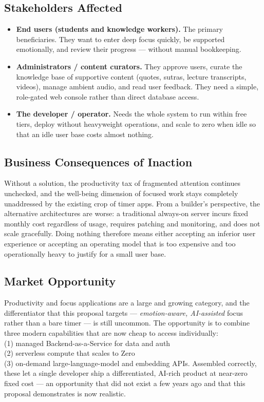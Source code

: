 \documentclass[a4paper,11pt]{article}
\begin{document}
	\subsection{Stakeholders Affected}
	\begin{itemize}
		\item \textbf{End users (students and knowledge workers).} The primary beneficiaries.
		      They want to enter deep focus quickly, be supported emotionally, and review their
		      progress --- without manual bookkeeping.
		\item \textbf{Administrators / content curators.} They approve users, curate the
		      knowledge base of supportive content (quotes, sutras, lecture transcripts,
		      videos), manage ambient audio, and read user feedback. They need a simple,
		      role-gated web console rather than direct database access.
		\item \textbf{The developer / operator.} Needs the whole system to run within free
		      tiers, deploy without heavyweight operations, and scale to zero when idle so that
		      an idle user base costs almost nothing.
	\end{itemize}

	\subsection{Business Consequences of Inaction}
	Without a solution, the productivity tax of fragmented attention continues unchecked, and
	the well-being dimension of focused work stays completely unaddressed by the existing crop
	of timer apps. From a builder's perspective, the alternative architectures are worse:
	a traditional always-on server incurs fixed monthly cost regardless of usage, requires
	patching and monitoring, and does not scale gracefully. Doing nothing therefore means
	either accepting an inferior user experience or accepting an operating model that is too
	expensive and too operationally heavy to justify for a small user base.

	\subsection{Market Opportunity}
	Productivity and focus applications are a large and growing category, and the differentiator
	that this proposal targets --- \emph{emotion-aware, AI-assisted} focus rather than a bare
	timer --- is still uncommon. The opportunity is to combine three modern capabilities that
	are now cheap to access individually: \\
	(1) managed Backend-as-a-Service for data and auth\\
	(2) serverless compute that scales to Zero\\
	(3) on-demand large-language-model and embedding APIs. Assembled correctly, these let a single developer ship a differentiated,
	AI-rich product at near-zero fixed cost --- an opportunity that did not exist a few years
	ago and that this proposal demonstrates is now realistic.
\end{document}
